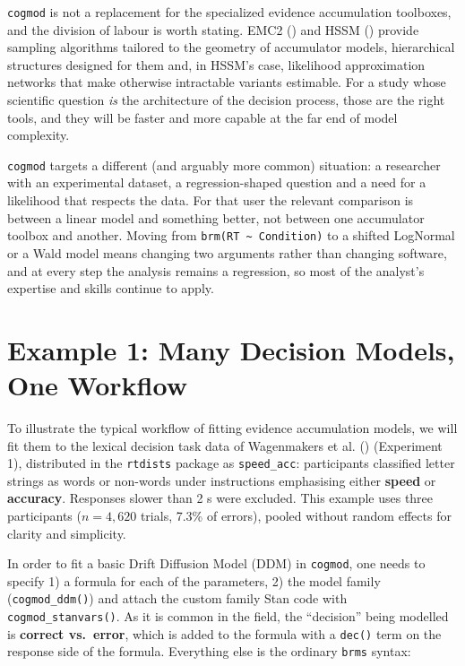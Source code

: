 \documentclass[
  jou,
  floatsintext,
  longtable,
  nolmodern,
  notxfonts,
  notimes,
  12pt,
  colorlinks=true,linkcolor=blue,citecolor=blue,urlcolor=blue]{apa7}
\begin{document}
\texttt{cogmod} is not a replacement for the specialized evidence
accumulation toolboxes, and the division of labour is worth stating.
EMC2 () and
HSSM () provide
sampling algorithms tailored to the geometry of accumulator models,
hierarchical structures designed for them and, in HSSM's case,
likelihood approximation networks that make otherwise intractable
variants estimable. For a study whose scientific question \emph{is} the
architecture of the decision process, those are the right tools, and
they will be faster and more capable at the far end of model complexity.

\texttt{cogmod} targets a different (and arguably more common)
situation: a researcher with an experimental dataset, a
regression-shaped question and a need for a likelihood that respects the
data. For that user the relevant comparison is between a linear model
and something better, not between one accumulator toolbox and another.
Moving from \texttt{brm(RT\ \textasciitilde{}\ Condition)} to a shifted
LogNormal or a Wald model means changing two arguments rather than
changing software, and at every step the analysis remains a regression,
so most of the analyst's expertise and skills continue to apply.

\section{Example 1: Many Decision Models, One
Workflow}\label{example-1-many-decision-models-one-workflow}

To illustrate the typical workflow of fitting evidence accumulation
models, we will fit them to the lexical decision task data of
Wagenmakers et al. ()
(Experiment 1), distributed in the \texttt{rtdists} package as
\texttt{speed\_acc}: participants classified letter strings as words or
non-words under instructions emphasising either \textbf{speed} or
\textbf{accuracy}. Responses slower than 2 s were excluded. This example
uses three participants (\(n = 4{,}620\) trials, 7.3\% of errors),
pooled without random effects for clarity and simplicity.

In order to fit a basic Drift Diffusion Model (DDM) in \texttt{cogmod},
one needs to specify 1) a formula for each of the parameters, 2) the
model family (\texttt{cogmod\_ddm()}) and attach the custom family Stan
code with \texttt{cogmod\_stanvars()}. As it is common in the field, the
``decision'' being modelled is \textbf{correct vs.~error}, which is
added to the formula with a \texttt{dec()} term on the response side of
the formula. Everything else is the ordinary \texttt{brms} syntax:
\end{document}
